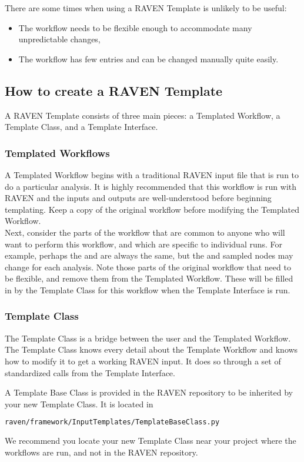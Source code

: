 There are some times when using a RAVEN Template is unlikely to be useful:
\begin{itemize}
  \item The workflow needs to be flexible enough to accommodate many unpredictable changes,
  \item The workflow has few entries and can be changed manually quite easily.
\end{itemize}

\subsection{How to create a RAVEN Template}
A RAVEN Template consists of three main pieces: a Templated Workflow, a Template Class, and a Template Interface.

\subsubsection{Templated Workflows}
A Templated Workflow begins with a traditional RAVEN input file that is run to do a particular analysis. It is highly recommended that this workflow is run with RAVEN and the inputs and outputs are well-understood before beginning templating. Keep a copy of the original workflow before modifying the Templated Workflow.
\\

Next, consider the parts of the workflow that are common to anyone who will want to perform this workflow, and which are specific to individual runs. For example, perhaps the  and  are always the same, but the  and sampled  nodes may change for each analysis. Note those parts of the original workflow that need to be flexible, and remove them from the Templated Workflow. These will be filled in by the Template Class for this workflow when the Template Interface is run.

\subsubsection{Template Class}
The Template Class is a bridge between the user and the Templated Workflow. The Template Class knows every detail about the Template Workflow and knows how to modify it to get a working RAVEN input.  It does so through a set of standardized calls from the Template Interface.

A Template Base Class is provided in the RAVEN repository to be inherited by your new Template Class. It is located in
\begin{lstlisting}[language=bash]
 raven/framework/InputTemplates/TemplateBaseClass.py
\end{lstlisting}
We recommend you locate your new Template Class near your project where the workflows are run, and not in the RAVEN repository.

